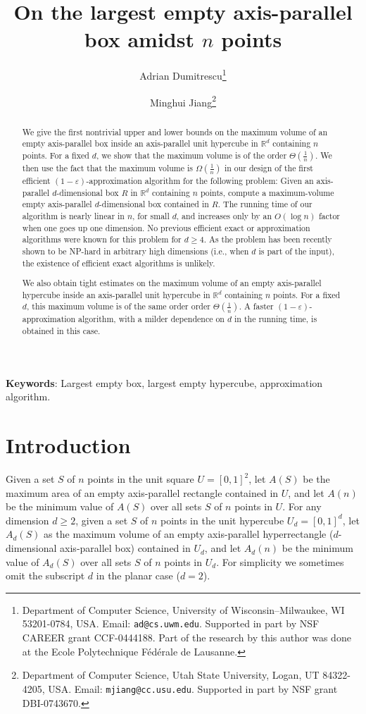 \documentclass[11pt]{article}
\title{On the largest empty axis-parallel box amidst $n$ points}
\author{Adrian Dumitrescu\thanks{Department of Computer Science,
University of Wisconsin--Milwaukee,
WI 53201-0784, USA\@. Email: \texttt{ad@cs.uwm.edu}.
Supported in part by NSF CAREER grant CCF-0444188.
Part of the research by this author was done at the
Ecole Polytechnique F\'ed\'erale de Lausanne.}
\and
Minghui Jiang\thanks{Department of Computer Science, 
Utah State University, Logan, UT 84322-4205, USA\@.
Email: \texttt{mjiang@cc.usu.edu}.
Supported in part by NSF grant DBI-0743670.}}
\newcommand{\eps}{\varepsilon}
\newcommand{\RR}{\mathbb{R}}
\begin{document}
\maketitle

\thispagestyle{empty}

\begin{abstract}
We give the first nontrivial upper and lower bounds on the maximum volume
of an empty axis-parallel box inside an axis-parallel unit hypercube
in $\RR^d$ containing $n$ points. 
For a fixed $d$, we show that the maximum volume is of the order
$\Theta\left(\frac{1}{n}\right)$.  We then  use the fact that the maximum volume is
$\Omega\left(\frac{1}{n}\right)$ in our design of the first efficient
$(1-\eps)$-approximation algorithm for the following problem: 
Given an axis-parallel $d$-dimensional box $R$ in $\RR^d$
containing $n$ points, compute a maximum-volume empty axis-parallel
$d$-dimensional box contained in $R$. The running time of our
algorithm is nearly linear in $n$, for small $d$, and increases only
by an $O(\log{n})$ factor when one goes up one dimension. 
No previous efficient exact or approximation algorithms were known for this
problem for $d \geq 4$. As the problem has been recently shown to be
NP-hard in arbitrary high dimensions (i.e., when $d$ is part of the
input), the existence of efficient exact algorithms is unlikely.

We also obtain tight estimates on the maximum volume of an empty
axis-parallel hypercube inside an axis-parallel unit hypercube
in $\RR^d$ containing $n$ points. For a fixed $d$, 
this maximum volume is of the same order order $\Theta\left(\frac{1}{n}\right)$.  
A faster $(1-\eps)$-approximation algorithm, with a  milder dependence
on $d$ in the running time, is obtained in this case.  
\end{abstract}

\medskip
\hspace{0.15in}
\textbf{\small Keywords}:
Largest empty box, largest empty hypercube, approximation algorithm.


\newpage
\setcounter{page}{1}
\setcounter{footnote}{0}

\section{Introduction}

Given a set $S$ of $n$ points in the unit square $U=[0,1]^2$,
let $A(S)$ be the maximum area of an empty axis-parallel rectangle
contained in $U$, and let $A(n)$ be the minimum value
of $A(S)$ over all sets $S$ of $n$ points in $U$.
For any dimension $d \geq 2$, given a set $S$ of $n$ points in the unit 
hypercube $U_d=[0,1]^d$, let $A_d(S)$ as the maximum volume of an
empty axis-parallel hyperrectangle ($d$-dimensional axis-parallel box)
contained in $U_d$, and let $A_d(n)$ be the minimum value of $A_d(S)$
over all sets $S$ of $n$ points in $U_d$.
For simplicity we sometimes omit the subscript $d$ in the planar case ($d=2$). 
\end{document}
